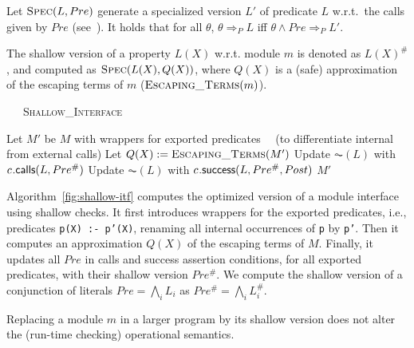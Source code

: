 \documentclass{llncs}
\begin{document}
\medskip
Let $\textsc{Spec}(L,Pre)$ generate a
specialized version $L'$ of
predicate $L$ w.r.t.\ the calls given by $Pre$
(see~\cite{ai-with-specs-sas06-short}). It holds that for all
$\theta$, $\theta \Rightarrow_{P} L$ iff $\theta \wedge Pre
\Rightarrow_{P} L'$.

\begin{definition}
  \label{def:shallow-prop}
  The shallow version of a property $L(X)$ w.r.t. module $m$ is
  denoted as $L(X)^{\#}$, and computed as $\textsc{Spec}(L(X),Q(X))$,
  where $Q(X)$ is a (safe) approximation of the escaping terms of $m$
  ($\textsc{Escaping\_Terms}(m)$).
\end{definition}

\begin{algorithm}[t]
  \caption{\ \ \ \textsc{Shallow\_Interface}\label{fig:shallow-itf}}
  \begin{algorithmic}[1]
    \State Let $M'$ be $M$ with wrappers for exported predicates
    \State ~~(to differentiate internal from external calls)
    \State Let $Q(X) := \textsc{Escaping\_Terms}(M')$
    \State Update $\AC(L)$ with $\textsf{\ensuremath{c_{}}.calls}(L, Pre^{\#})$
    \EndFor
    \State Update $\AC(L)$ with $\textsf{\ensuremath{c_{}}.success}(L,Pre^{\#},Post)$
    \EndFor
    \EndFor
    \State \Return $M'$
    \EndFunction
  \end{algorithmic}
%
\end{algorithm}
%
Algorithm~\ref{fig:shallow-itf} computes the
optimized version of a module interface using shallow checks.
%
It first introduces wrappers for the exported predicates,
i.e., predicates \texttt{p(X) :- p'(X)}, %
renaming all internal
occurrences of \texttt{p} by \texttt{p'}.
%
Then it computes an approximation $Q(X)$ of the escaping terms of $M$.
%
Finally, it updates all $Pre$ in calls and success assertion
conditions, for all exported predicates, with their shallow version
$Pre^{\#}$.
%
We compute the shallow version of a conjunction of literals
$Pre=\bigwedge_i L_i$
as $Pre^{\#}=\bigwedge_i L_i^{\#}$.


\begin{theorem}
  \label{theorem:shallow-op-correct}
  Replacing a module $m$ in a larger program by its shallow version
  does not alter the (run-time checking) operational semantics.
\end{theorem}
\end{document}
